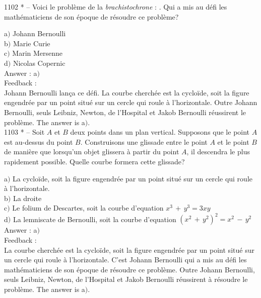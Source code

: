 ﻿\documentclass[letterpaper, 12pt]{article}
\begin{document}
1102 * -- Voici le probl\`eme de la {\it brachistochrone} : \fg. Qui a mis au
d\'efi les math\'ematiciens de son \'epoque de r\'esoudre ce
probl\`eme?

a$)$ Johann Bernoulli \\
b$)$ Marie Curie  \\
c$)$ Marin Mersenne  \\
d$)$ Nicolas Copernic \\

Answer : a$)$\\

Feedback : \\
Johann Bernoulli lan\c ca ce d\'efi. La courbe cherch\'ee est la
cyclo\"ide, soit la figure engendr\'ee par un point situ\'e sur un
cercle qui roule \`a l'horizontale. Outre Johann Bernoulli, seuls
Leibniz, Newton, de l'Hospital et Jakob Bernoulli r\'eussirent le
probl\`eme.
The answer is a$)$.\\

1103 * -- Soit $A$ et $B$ deux points dans un plan vertical.
Supposons que le point $A$ est au-dessus du point $B$. Construisons
une glissade entre le point $A$ et le point $B$ de mani\`ere que
lorsqu'un objet glissera \`a partir du point $A$, il descendra le
plus rapidement possible. Quelle courbe formera cette glissade?

a$)$ La cyclo\"ide, soit la figure engendr\'ee par un point situ\'e
sur un
cercle qui roule \`a l'horizontale. \\
b$)$ La droite  \\
c$)$ Le folium de Descartes, soit la courbe d'equation $x^3\,+\,y^3=3xy$
\\
d$)$ La lemniscate de Bernoulli, soit la courbe d'equation
$(x^2\,+\,y^2)^2=x^2\,-\,y^2$\\

Answer : a$)$\\

Feedback : \\
La courbe cherch\'ee est la cyclo\"ide, soit la figure engendr\'ee
par un point situ\'e sur un cercle qui roule \`a l'horizontale.
C'est Johann Bernoulli qui a mis au d\'efi les math\'ematiciens de
son \'epoque de r\'esoudre ce probl\`eme. Outre Johann Bernoulli,
seuls Leibniz, Newton, de l'Hospital et Jakob Bernoulli r\'eussirent
\`a r\'esoudre le probl\`eme.
The answer is a$)$.\\
\end{document}
